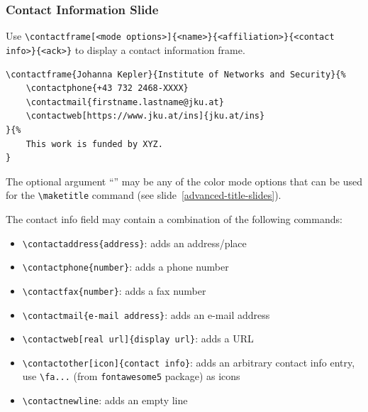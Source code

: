 \documentclass[utf8,aspectratio=169,ngerman,english]{beamer}
\begin{document}
\begin{frame}
\frametitle{Contact Information Slide}

Use \verb|\contactframe[<mode options>]{<name>}{<affiliation>}{<contact info>}{<ack>}| to display a contact information frame. 
\begin{lstlisting}[language={[LaTeX]TeX},numbers=none]
\contactframe{Johanna Kepler}{Institute of Networks and Security}{%
    \contactphone{+43 732 2468-XXXX}
    \contactmail{firstname.lastname@jku.at}
    \contactweb[https://www.jku.at/ins]{jku.at/ins}
}{%
    This work is funded by XYZ.
}
\end{lstlisting}
The optional argument ``'' may be any of the color mode options that can be used for the \verb|\maketitle| command (see slide~\ref{advanced-title-slides}).

\framebreak
The contact info field may contain a combination of the following commands:
\begin{itemize}
\item \verb|\contactaddress{address}|: adds an address/place
\item \verb|\contactphone{number}|: adds a phone number
\item \verb|\contactfax{number}|: adds a fax number
\item \verb|\contactmail{e-mail address}|: adds an e-mail address
\item \verb|\contactweb[real url]{display url}|: adds a URL
\item \verb|\contactother[icon]{contact info}|: adds an arbitrary contact info entry, use \verb|\fa...| (from \verb|fontawesome5| package) as icons
\item \verb|\contactnewline|: adds an empty line
\end{itemize}
\end{frame}


\end{document}
